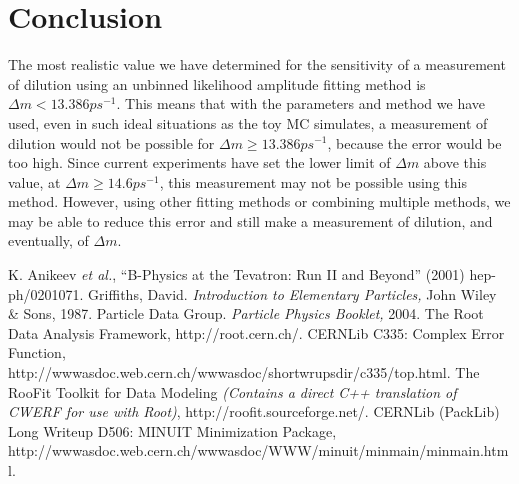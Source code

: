 \documentclass[10pt]{article}
\begin{document}
\section{Conclusion}

The most realistic value we have determined for the sensitivity of
a measurement of dilution using an unbinned likelihood amplitude
fitting method is $\Delta m < 13.386ps^{-1}$.  This means that
with the parameters and method we have used, even in such ideal
situations as the toy MC simulates, a measurement of dilution
would not be possible for $\Delta m \geq 13.386ps^{-1}$, because
the error would be too high.  Since current experiments have set
the lower limit of $\Delta m$ above this value, at $\Delta m \geq
14.6ps^{-1}$, this measurement may not be possible using this
method.  However, using other fitting methods or combining
multiple methods, we may be able to reduce this error and still
make a measurement of dilution, and eventually, of $\Delta m$.


\begin{thebibliography}{0}

 K. Anikeev {\it et al.}, ``B-Physics at the Tevatron: Run II and Beyond'' (2001) hep-ph/0201071.
 Griffiths, David. {\it Introduction to Elementary Particles,} John Wiley \& Sons, 1987.
 Particle Data Group. {\it Particle Physics Booklet,} 2004.
 The Root Data Analysis Framework, http://root.cern.ch/.
 CERNLib C335: Complex Error Function, \\http://wwwasdoc.web.cern.ch/wwwasdoc/shortwrupsdir/c335/top.html.
 The RooFit Toolkit for Data Modeling {\em (Contains a direct C++ translation of CWERF for use with Root)}, http://roofit.sourceforge.net/.
 CERNLib (PackLib) Long Writeup D506: MINUIT Minimization Package, http://wwwasdoc.web.cern.ch/wwwasdoc/WWW/minuit/minmain/minmain.html.
\end{thebibliography}
\end{document}
